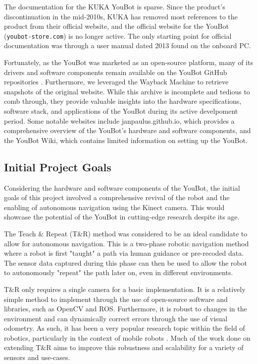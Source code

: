 \documentclass[a4paper, 12pt]{article}
\newif\ifshownotes
\newcommand{\notes}[1]{\ifshownotes\textcolor{blue}{#1}\fi}
\begin{document}
    The documentation for the KUKA YouBot is sparse. Since the product's discontinuation in the mid-2010s, KUKA has removed most references to the product from their official website, and the official website for the YouBot (\texttt{youbot-store.com}) is no longer active. The only starting point for official documentation was through a user manual dated 2013 found on the onboard PC. 

    Fortunately, as the YouBot was marketed as an open-source platform, many of its drivers and software components remain available on the YouBot GitHub repositories \notes{[cite]}. Furthermore, we leveraged the Wayback Machine \notes{[cite]} to retrieve snapshots of the original website. While this archive is incomplete and tedious to comb through, they provide valuable insights into the hardware specifications, software stack, and applications of the YouBot during its active develpoment period. Some notable websites include janpaulus.github.io, which provides a comprehensive overview of the YouBot's hardware and software components, and the YouBot Wiki, which contains limited information on setting up the YouBot. 

    \notes{add images of some of the more interesting websites here, and some of the images regarding the youbot's specifications.}

    \subsection{Initial Project Goals}

    Considering the hardware and software components of the YouBot, the initial goals of this project involved a comprehensive revival of the robot and the enabling of autonomous navigation using the Kinect camera. This would showcase the potential of the YouBot in cutting-edge research despite its age. 

    The Teach \& Repeat (T\&R) method was considered to be an ideal candidate to allow for autonomous navigation. This\notes{[cite]} is a two-phase robotic navigation method where a robot is first "taught" a path via human guidance or pre-recoded data. The sensor data captured during this phase can then be used to allow the robot to autonomously "repeat" the path later on, even in different environments.

    T\&R only requires a single camera for a basic implementation. It is a relatively simple method to implement through the use of open-source software and libraries, such as OpenCV and ROS. Furthermore, it is robust to changes in the environment and can dynamically correct errors through the use of visual odometry. As such, it has been a very popular research topic within the field of robotics, particularly in the context of mobile robots \notes{[cite]}. Much of the work done on extending T\&R aims to improve this robustness and scalability for a variety of sensors and use-cases. 
\end{document}

